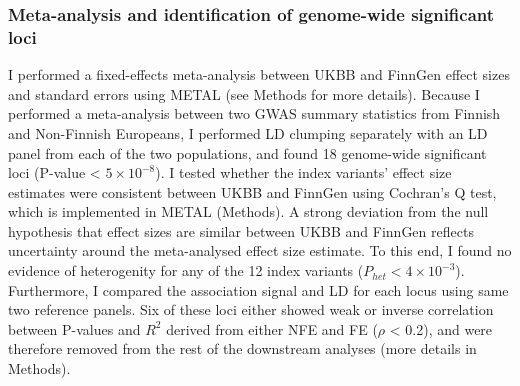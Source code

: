     \subsubsection{Meta-analysis and identification of genome-wide significant loci}
    I performed a fixed-effects meta-analysis between UKBB and FinnGen effect sizes and standard errors using METAL (see Methods for more details). Because I performed a meta-analysis between two GWAS summary statistics from Finnish and Non-Finnish Europeans, I performed LD clumping separately with an LD panel from each of the two populations, and found 18 genome-wide significant loci (P-value < $5\times10^{-8}$). I tested whether the index variants' effect size estimates were consistent between UKBB and FinnGen using Cochran's Q test, which is implemented in METAL (Methods). A strong deviation from the null hypothesis that effect sizes are similar between UKBB and FinnGen reflects uncertainty around the meta-analysed effect size estimate. To this end, I found no evidence of heterogenity for any of the 12 index variants ($P_{het} < 4\times10^{-3}$). Furthermore, I compared the association signal and LD for each locus using same two reference panels. Six of these loci either showed weak or inverse correlation between P-values and $R^{2}$ derived from either NFE and FE ($\rho$ < 0.2), and were therefore removed from the rest of the downstream analyses (more details in Methods).\\
    

